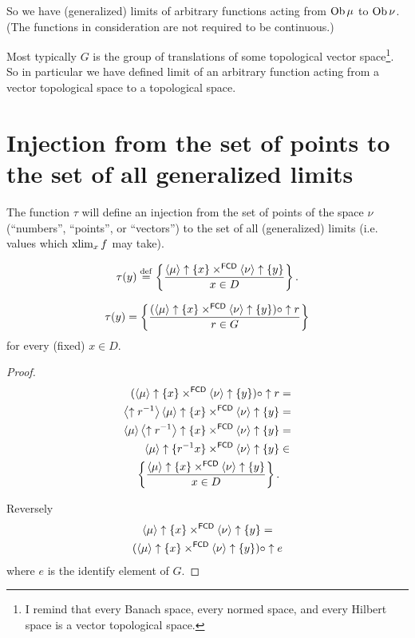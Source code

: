 So we have (generalized) limits of arbitrary functions
acting from $\operatorname{Ob}\mu$ to $\operatorname{Ob}\nu$. (The functions in consideration
are not required to be continuous.)

\begin{rem}
Most typically $G$ is the group of translations of some topological vector space\footnote{I remind that every Banach space, every normed space, and every Hilbert space is a vector topological space.}. So in particular we have defined limit of an arbitrary function acting from a vector topological space to a topological space.
\end{rem}

\section[Injection to generalized limits]{Injection from the set of points to the set of all generalized limits}

The function $\tau$ will define an injection from the set of points
of the space $\nu$ (``numbers'', ``points'', or ``vectors'')
to the set of all (generalized) limits (i.e. values which $\operatorname{xlim}_{x}f$
may take).
\begin{defn}
\[ \tau(y)\overset{\mathrm{def}}{=}\left\{ \frac{\left\langle \mu\right\rangle\uparrow\{x\}\times^{\mathsf{FCD}}\left\langle \nu\right\rangle\uparrow\{y\}}{x\in D}\right\}. \]
\end{defn}
\begin{prop}
\[ \tau(y)=\left\{ \frac{(\left\langle \mu\right\rangle\uparrow\{x\}\times^{\mathsf{FCD}}\left\langle \nu\right\rangle\uparrow\{y\})\circ\uparrow r}{r\in G}\right\} \]
for every (fixed) $x\in D$.\end{prop}

\begin{proof}
~
\begin{align*}
(\left\langle \mu\right\rangle\uparrow\{x\}\times^{\mathsf{FCD}}\left\langle \nu\right\rangle\uparrow\{y\})\circ\uparrow r & =\\
\left\langle \uparrow r^{-1}\right\rangle\left\langle \mu\right\rangle\uparrow\{x\}\times^{\mathsf{FCD}}\left\langle \nu\right\rangle\uparrow\{y\} & =\\
\left\langle \mu\right\rangle\left\langle \uparrow r^{-1}\right\rangle\uparrow\{x\}\times^{\mathsf{FCD}}\left\langle \nu\right\rangle\uparrow\{y\} & =\\
\left\langle \mu\right\rangle\uparrow\{r^{-1}x\}\times^{\mathsf{FCD}}\left\langle \nu\right\rangle\uparrow\{y\} & \in \\ \left\{ \frac{\left\langle \mu\right\rangle\uparrow\{x\}\times^{\mathsf{FCD}}\left\langle \nu\right\rangle\uparrow\{y\}}{x\in D}\right\}.
\end{align*}


Reversely
\begin{multline*}
\left\langle \mu\right\rangle\uparrow\{x\}\times^{\mathsf{FCD}}\left\langle \nu\right\rangle\uparrow\{y\}=\\(\left\langle \mu\right\rangle\uparrow\{x\}\times^{\mathsf{FCD}}\left\langle \nu\right\rangle\uparrow\{y\})\circ\uparrow e
\end{multline*}
where $e$ is the identify element of $G$.\end{proof}

